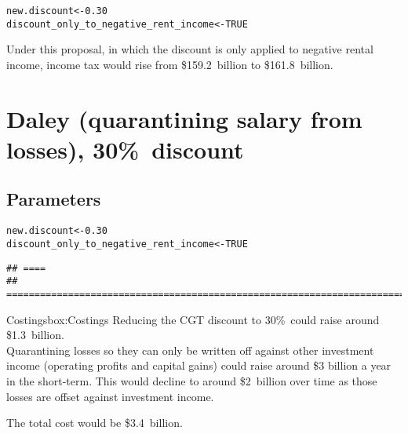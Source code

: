 \documentclass{grattan}\usepackage[]{graphicx}\usepackage[]{color}
\makeatletter
\newcommand{\hlnum}[1]{\textcolor[rgb]{0.686,0.059,0.569}{#1}}%
\newcommand{\hlstd}[1]{\textcolor[rgb]{0.345,0.345,0.345}{#1}}%
\newcommand{\hlkwb}[1]{\textcolor[rgb]{0.69,0.353,0.396}{#1}}%
\newenvironment{kframe}{%
 \def\at@end@of@kframe{}%
 \ifinner\ifhmode%
  \def\at@end@of@kframe{\end{minipage}}%
  \begin{minipage}{\columnwidth}%
 \fi\fi%
 \def\FrameCommand##1{\hskip\@totalleftmargin \hskip-\fboxsep
 \colorbox{shadecolor}{##1}\hskip-\fboxsep
     \hskip-\linewidth \hskip-\@totalleftmargin \hskip\columnwidth}%
 \MakeFramed {\advance\hsize-\width
   \@totalleftmargin\z@ \linewidth\hsize
   \@setminipage}}%
 {\par\unskip\endMakeFramed%
 \at@end@of@kframe}
\newenvironment{knitrout}{}{} %
\makeatother
\begin{document}
\begin{knitrout}
\color{fgcolor}\begin{kframe}
\begin{alltt}
\hlstd{new.discount} \hlkwb{<-} \hlnum{0.30}
\hlstd{discount_only_to_negative_rent_income} \hlkwb{<-} \hlnum{TRUE}
\end{alltt}
\end{kframe}
\end{knitrout}




Under this proposal, in which the discount is only applied to negative rental income, income tax would rise from \$159.2~billion to \$161.8~billion.

\section{Daley (quarantining salary from losses), 30\%\ discount}
\subsection{Parameters}
\begin{knitrout}
\color{fgcolor}\begin{kframe}
\begin{alltt}
\hlstd{new.discount} \hlkwb{<-} \hlnum{0.30}
\hlstd{discount_only_to_negative_rent_income} \hlkwb{<-} \hlnum{TRUE}
\end{alltt}
\end{kframe}
\end{knitrout}






\begin{knitrout}
\color{fgcolor}\begin{kframe}
\begin{verbatim}
## ====
## =======================================================================
\end{verbatim}
\end{kframe}
\end{knitrout}

\begin{smallbox}{Costings}{box:Costings}
Reducing the CGT discount to 30\%\ could raise around \$1.3~billion. \\

Quarantining losses so they can only be written off against other investment income (operating profits and capital gains) could raise around \$3 billion a year in the short-term. This would decline to around \$2~billion over time as those losses are offset against investment income.

The total cost would be \$3.4~billion.
\end{smallbox}
\end{document}
